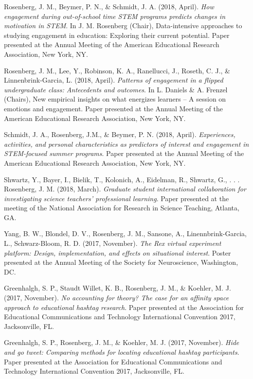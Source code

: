 \documentclass[]{article}
\begin{document}
Rosenberg, J. M., Beymer, P. N., \& Schmidt, J. A. (2018, April).
\emph{How engagement during out-of-school time STEM programs predicts
changes in motivation in STEM}. In J. M. Rosenberg (Chair),
Data-intensive approaches to studying engagement in education: Exploring
their current potential. Paper presented at the Annual Meeting of the
American Educational Research Association, New York, NY.

Rosenberg, J. M., Lee, Y., Robinson, K. A., Ranellucci, J., Roseth, C.
J., \& Linnenbrink-Garcia, L. (2018, April). \emph{Patterns of
engagement in a flipped undergraduate class: Antecedents and outcomes}.
In L. Daniels \& A. Frenzel (Chairs), New empirical insights on what
energizes learners -- A session on emotions and engagement. Paper
presented at the Annual Meeting of the American Educational Research
Association, New York, NY.

Schmidt, J. A., Rosenberg, J.M., \& Beymer, P. N. (2018, April).
\emph{Experiences, activities, and personal characteristics as
predictors of interest and engagement in STEM-focused summer programs}.
Paper presented at the Annual Meeting of the American Educational
Research Association, New York, NY.

Shwartz, Y., Bayer, I., Bielik, T., Kolonich, A., Eidelman, R., Shwartz,
G., . . . Rosenberg, J. M. (2018, March). \emph{Graduate student
international collaboration for investigating science teachers'
professional learning}. Paper presented at the meeting of the National
Association for Research in Science Teaching, Atlanta, GA.

Yang, B. W., Blondel, D. V., Rosenberg, J. M., Sansone, A.,
Linennbrink-Garcia, L., Schwarz-Bloom, R. D. (2017, November). \emph{The
Rex virtual experiment platform: Design, implementation, and effects on
situational interest}. Poster presented at the Annual Meeting of the
Society for Neuroscience, Washington, DC.

Greenhalgh, S. P., Staudt Willet, K. B., Rosenberg, J. M., \& Koehler,
M. J. (2017, November). \emph{No accounting for theory? The case for an
affinity space approach to educational hashtag research}. Paper
presented at the Association for Educational Communications and
Technology International Convention 2017, Jacksonville, FL.

Greenhalgh, S. P., Rosenberg, J. M., \& Koehler, M. J. (2017, November).
\emph{Hide and go tweet: Comparing methods for locating educational
hashtag participants}. Paper presented at the Association for
Educational Communications and Technology International Convention 2017,
Jacksonville, FL.
\end{document}

